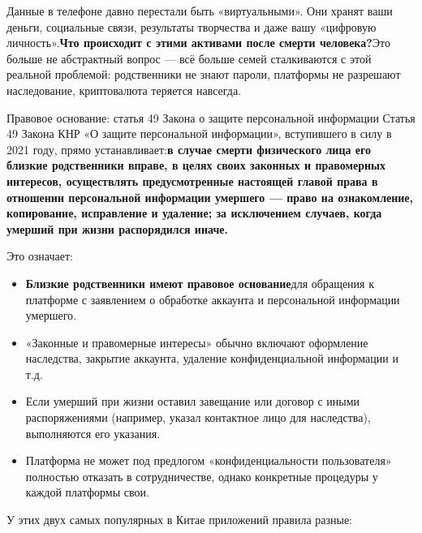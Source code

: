 
Данные в телефоне давно перестали быть «виртуальными». Они хранят ваши деньги, социальные связи, результаты творчества и даже вашу «цифровую личность».\textbf{Что происходит с этими активами после смерти человека?}Это больше не абстрактный вопрос — всё больше семей сталкиваются с этой реальной проблемой: родственники не знают пароли, платформы не разрешают наследование, криптовалюта теряется навсегда.

\begin{tcbinfo}{Правовое основание: статья 49 Закона о защите персональной информации}
Статья 49 Закона КНР «О защите персональной информации», вступившего в силу в 2021 году, прямо устанавливает:\textbf{в случае смерти физического лица его близкие родственники вправе, в целях своих законных и правомерных интересов, осуществлять предусмотренные настоящей главой права в отношении персональной информации умершего — право на ознакомление, копирование, исправление и удаление; за исключением случаев, когда умерший при жизни распорядился иначе.}

Это означает:

\begin{itemize}
  \item \textbf{Близкие родственники имеют правовое основание}для обращения к платформе с заявлением о обработке аккаунта и персональной информации умершего.
  \item «Законные и правомерные интересы» обычно включают оформление наследства, закрытие аккаунта, удаление конфиденциальной информации и т.д.
  \item Если умерший при жизни оставил завещание или договор с иными распоряжениями (например, указал контактное лицо для наследства), выполняются его указания.
  \item Платформа не может под предлогом «конфиденциальности пользователя» полностью отказать в сотрудничестве, однако конкретные процедуры у каждой платформы свои.
\end{itemize}

\end{tcbinfo}


У этих двух самых популярных в Китае приложений правила разные:

